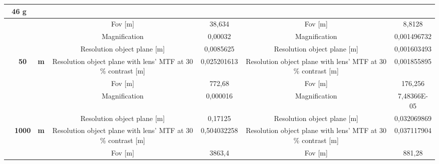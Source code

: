 \begin{table}[H]
{\begin{tabular}{ccc|cc|cc|}
  \multicolumn{2}{c|}{46 g} \\ \hline
\multicolumn{1}{|c|}{} &
  \cellcolor[HTML]{EFEFEF} &
  \cellcolor[HTML]{EFEFEF} &
  \cellcolor[HTML]{EFEFEF}Fov {[}m{]} &
  \cellcolor[HTML]{EFEFEF}38,634 &
  \cellcolor[HTML]{EFEFEF}Fov {[}m{]} &
  \cellcolor[HTML]{EFEFEF}8,8128 \\
\multicolumn{1}{|c|}{} &
  \cellcolor[HTML]{EFEFEF} &
  \cellcolor[HTML]{EFEFEF} &
  Magnification &
  0,00032 &
  Magnification &
  0,001496732 \\
\multicolumn{1}{|c|}{} &
  \cellcolor[HTML]{EFEFEF} &
  \cellcolor[HTML]{EFEFEF} &
  \cellcolor[HTML]{EFEFEF}Resolution object plane {[}m{]} &
  \cellcolor[HTML]{EFEFEF}0,0085625 &
  \cellcolor[HTML]{EFEFEF}Resolution object plane {[}m{]} &
  \cellcolor[HTML]{EFEFEF}0,001603493 \\
\multicolumn{1}{|c|}{} &
  \multirow{-4}{*}{\cellcolor[HTML]{EFEFEF}\textbf{50}} &
  \multirow{-4}{*}{\cellcolor[HTML]{EFEFEF}\textbf{m}} &
  Resolution object plane with lens' MTF at 30 \% contrast {[}m{]} &
  0,025201613 &
  Resolution object plane with lens' MTF at 30 \% contrast {[}m{]} &
  0,001855895 \\ \cline{2-7} 
\multicolumn{1}{|c|}{} &
  \cellcolor[HTML]{EFEFEF} &
  \cellcolor[HTML]{EFEFEF} &
  \cellcolor[HTML]{EFEFEF}Fov {[}m{]} &
  \cellcolor[HTML]{EFEFEF}772,68 &
  \cellcolor[HTML]{EFEFEF}Fov {[}m{]} &
  \cellcolor[HTML]{EFEFEF}176,256 \\
\multicolumn{1}{|c|}{} &
  \cellcolor[HTML]{EFEFEF} &
  \cellcolor[HTML]{EFEFEF} &
  Magnification &
  0,000016 &
  Magnification &
  7,48366E-05 \\
\multicolumn{1}{|c|}{} &
  \cellcolor[HTML]{EFEFEF} &
  \cellcolor[HTML]{EFEFEF} &
  \cellcolor[HTML]{EFEFEF}Resolution object plane {[}m{]} &
  \cellcolor[HTML]{EFEFEF}0,17125 &
  \cellcolor[HTML]{EFEFEF}Resolution object plane {[}m{]} &
  \cellcolor[HTML]{EFEFEF}0,032069869 \\
\multicolumn{1}{|c|}{} &
  \multirow{-4}{*}{\cellcolor[HTML]{EFEFEF}\textbf{1000}} &
  \multirow{-4}{*}{\cellcolor[HTML]{EFEFEF}\textbf{m}} &
  Resolution object plane with lens' MTF at 30 \% contrast {[}m{]} &
  0,504032258 &
  Resolution object plane with lens' MTF at 30 \% contrast {[}m{]} &
  0,037117904 \\ \cline{2-7} 
\multicolumn{1}{|c|}{} &
  \cellcolor[HTML]{EFEFEF} &
  \cellcolor[HTML]{EFEFEF} &
  \cellcolor[HTML]{EFEFEF}Fov {[}m{]} &
  \cellcolor[HTML]{EFEFEF}3863,4 &
  \cellcolor[HTML]{EFEFEF}Fov {[}m{]} &
  \cellcolor[HTML]{EFEFEF}881,28 \\

\end{tabular}}
\end{table}
